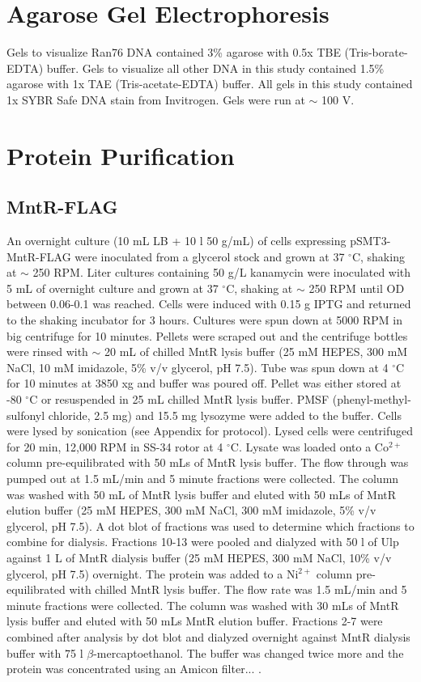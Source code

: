 \documentclass[12pt,twoside]{reedthesis}
\begin{document}
 
\section{Agarose Gel Electrophoresis}

Gels to visualize Ran76 DNA contained 3\% agarose with 0.5x TBE (Tris-borate-EDTA) buffer. Gels to visualize all other DNA in this study contained 1.5\% agarose with 1x TAE (Tris-acetate-EDTA) buffer. All gels in this study contained 1x SYBR Safe DNA stain from Invitrogen. Gels were run at $\sim$ 100 V. 

\section{Protein Purification}

\subsection{MntR-FLAG}

An overnight culture (10 mL LB + 10 \micro l 50 \micro g/mL) of cells expressing pSMT3-MntR-FLAG were inoculated from a glycerol stock and grown at 37 $^\circ$C, shaking at $\sim$ 250 RPM. Liter cultures containing 50 \micro g/L kanamycin were inoculated with 5 mL of overnight culture and grown at 37 $^\circ$C, shaking at $\sim$ 250 RPM until OD between 0.06-0.1 was reached. Cells were induced with 0.15 g IPTG and returned to the shaking incubator for 3 hours. Cultures were spun down at 5000 RPM in big centrifuge for 10 minutes. Pellets were scraped out and the centrifuge bottles were rinsed with $\sim$ 20 mL of chilled MntR lysis buffer (25 mM HEPES, 300 mM NaCl, 10 mM imidazole, 5\% v/v glycerol, pH 7.5). Tube was spun down at 4 $^\circ$C for 10 minutes at 3850 xg and buffer was poured off. Pellet was either stored at -80 $^\circ$C or resuspended in 25 mL chilled MntR lysis buffer. PMSF (phenyl-methyl-sulfonyl chloride, 2.5 mg) and 15.5 mg lysozyme were added to the buffer. Cells were lysed by sonication (see Appendix for protocol). Lysed cells were centrifuged for 20 min, 12,000 RPM in SS-34 rotor at 4 $^\circ$C. Lysate was loaded onto a Co$^{2+}$ column pre-equilibrated with 50 mLs of MntR lysis buffer. The flow through was pumped out at 1.5 mL/min and 5 minute fractions were collected. The column was washed with 50 mL of MntR lysis buffer and eluted with 50 mLs of MntR elution buffer (25 mM HEPES, 300 mM NaCl, 300 mM imidazole, 5\% v/v glycerol, pH 7.5). A dot blot of fractions was used to determine which fractions to combine for dialysis. Fractions 10-13 were pooled and dialyzed with 50 \micro l of Ulp against 1 L of MntR dialysis buffer (25 mM HEPES, 300 mM NaCl, 10\% v/v glycerol, pH 7.5) overnight. The protein was added to a Ni$^{2+}$ column pre-equilibrated with chilled MntR lysis buffer. The flow rate was 1.5 mL/min and 5 minute fractions were collected. The column was washed with 30 mLs of MntR lysis buffer and eluted with 50 mLs MntR elution buffer. Fractions 2-7 were combined after analysis by dot blot and dialyzed overnight against MntR dialysis buffer with 75 \micro l $\beta$-mercaptoethanol. The buffer was changed twice more and the protein was concentrated using an Amicon filter... . 
\end{document}
